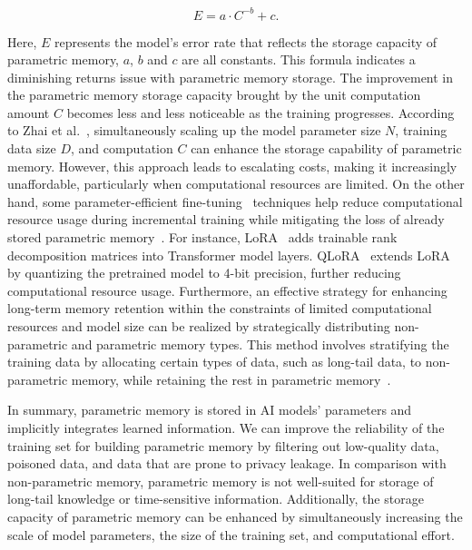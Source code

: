 \documentclass[journal,hideappendix]{vgtc}
\newenvironment{j_itemize}{
\begin{itemize}[]
  \setlength{\itemsep}{3pt}
  \setlength{\parskip}{0pt}
  \setlength{\parsep}{0pt}
}{\end{itemize}}
\begin{document}
\begin{j_itemize}
     {\fontsize{10}{12}\selectfont
    \[ E = a \cdot C^{-b} + c. \]}
    
     Here, $E$ represents the model's error rate that reflects the storage capacity of parametric memory, $a$, $b$ and $c$ are all constants. This formula indicates a diminishing returns issue with parametric memory storage. The improvement in the parametric memory storage capacity brought by the unit computation amount $C$ becomes less and less noticeable as the training progresses. According to Zhai et al.~\cite{zhai2022scaling}, simultaneously scaling up the model parameter size $N$, training data size $D$, and computation $C$ can enhance the storage capability of parametric memory. However, this approach leads to escalating costs, making it increasingly unaffordable, particularly when computational resources are limited. 
     On the other hand, some parameter-efficient fine-tuning~\cite{lialin2023scaling,ding2023parameter} techniques help reduce computational resource usage during incremental training while mitigating the loss of already stored parametric memory~\cite{kalajdzievski2024scaling,ren2024analyzing}. For instance, LoRA~\cite{hu2021lora} adds trainable rank decomposition matrices into Transformer model layers. QLoRA~\cite{dettmers2024qlora} extends LoRA by quantizing the pretrained model to 4-bit precision, further reducing computational resource usage.
     Furthermore, an effective strategy for enhancing long-term memory retention within the constraints of limited computational resources and model size can be realized by strategically distributing non-parametric and parametric memory types. This method involves stratifying the training data by allocating certain types of data, such as long-tail data, to non-parametric memory, while retaining the rest in parametric memory~\cite{izacard2023atlas,mallen2023trust}.

\end{j_itemize}

In summary, parametric memory is stored in AI models' parameters and implicitly integrates learned information. We can improve the reliability of the training set for building parametric memory by filtering out low-quality data, poisoned data, and data that are prone to privacy leakage. 
In comparison with non-parametric memory, parametric memory is not well-suited for storage of long-tail knowledge or time-sensitive information. 
Additionally, the storage capacity of parametric memory can be enhanced by simultaneously increasing the scale of model parameters, the size of the training set, and computational effort.
\end{document}
